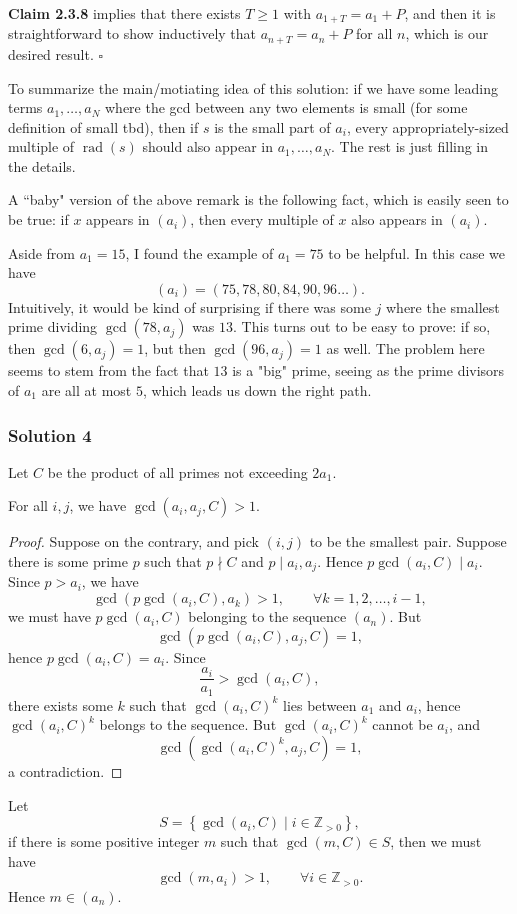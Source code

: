 \documentclass[11pt]{article}
\begin{document}
\noindent
\textcolor{GlacierBlue}{\textbf{Claim 2.3.8}} implies that there exists $T \geq 1$ with $a_{1+T}=a_1+P$, and then it is straightforward to show inductively that $a_{n+T}=a_n+P$ for all $n$, which is our desired result. $\square$
\begin{remark*}
To summarize the main/motiating idea of this solution: if we have some leading terms $a_1,\ldots,a_N$ where the gcd between any two elements is small (for some definition of small tbd), then if $s$ is the small part of $a_i$, every appropriately-sized multiple of $\operatorname{rad}(s)$ should also appear in $a_1,\ldots,a_N$. The rest is just filling in the details.
\end{remark*}
\begin{remark*}
A ``baby" version of the above remark is the following fact, which is easily seen to be true: if $x$ appears in $(a_i)$, then every multiple of $x$ also appears in $(a_i)$.
\end{remark*}
\begin{remark*}
Aside from $a_1=15$, I found the example of $a_1=75$ to be helpful. In this case we have
$$(a_i)=(75,78,80,84,90,96\ldots).$$Intuitively, it would be kind of surprising if there was some $j$ where the smallest prime dividing $\gcd(78,a_j)$ was $13$. This turns out to be easy to prove: if so, then $\gcd(6,a_j)=1$, but then $\gcd(96,a_j)=1$ as well. The problem here seems to stem from the fact that $13$ is a "big" prime, seeing as the prime divisors of $a_1$ are all at most $5$, which leads us down the right path.
\end{remark*}
\newpage
\subsubsection{Solution 4}
Let $C$ be the product of all primes not exceeding $2a_1$.
\begin{claim}
    For all $i, j$, we have $\gcd(a_i, a_j, C) > 1$.
\end{claim}
\begin{proof}
    Suppose on the contrary, and pick $(i, j)$ to be the smallest pair. Suppose there is some prime $p$ such that $p \nmid C$ and $p \mid a_i, a_j$. Hence $p\gcd(a_i, C) \mid a_i$. Since $p > a_i$, we have
\[
\gcd\left(p\gcd(a_i, C), a_k\right) > 1,\qquad \forall k = 1, 2, \ldots, i-1,
\]we must have $p\gcd(a_i, C)$ belonging to the sequence $(a_n)$. But
\[
\gcd\left(p\gcd(a_i, C), a_j, C\right) = 1,
\]hence $p\gcd(a_i, C) = a_i$. Since
\[
\dfrac{a_i}{a_1} > \gcd(a_i, C),
\]there exists some $k$ such that $\gcd(a_i, C)^k$ lies between $a_1$ and $a_i$, hence $\gcd(a_i, C)^k$ belongs to the sequence. But $\gcd(a_i, C)^k$ cannot be $a_i$, and
\[
\gcd\left(\gcd(a_i, C)^k, a_j, C\right) = 1,
\]a contradiction. 
\end{proof}
\noindent
Let
\[
S=\left\{\gcd(a_i,C)\mid i\in\mathbb{Z}_{>0}\right\},
\]if there is some positive integer $m$ such that $\gcd(m,C)\in S$, then we must have
\[
\gcd(m,a_i)>1,\qquad \forall i\in\mathbb{Z}_{>0}.
\]Hence $m\in(a_n)$.
\end{document}
